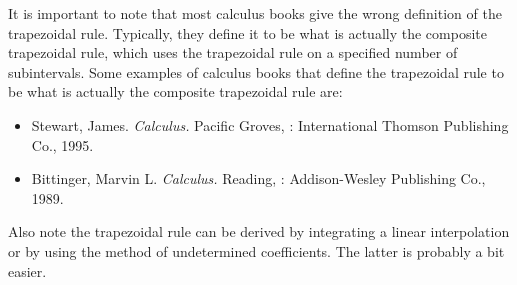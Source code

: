 \documentclass[12pt]{article}
\begin{document}
It is important to note that most calculus books give the wrong definition of the trapezoidal rule.  Typically, they define it to be what is actually the composite trapezoidal rule, which uses the trapezoidal rule on a specified number of subintervals.  Some examples of calculus books that define the trapezoidal rule to be what is actually the composite trapezoidal rule are:

\begin{itemize}
\item Stewart, James.  \emph{Calculus.}  Pacific Groves, : International Thomson Publishing Co., 1995.
\item Bittinger, Marvin L.  \emph{Calculus.}  Reading, : Addison-Wesley Publishing Co., 1989.
\end{itemize}

Also note the trapezoidal rule can be derived by integrating a linear interpolation or by using the
method of undetermined coefficients.  The latter is probably a bit easier.
\end{document}
